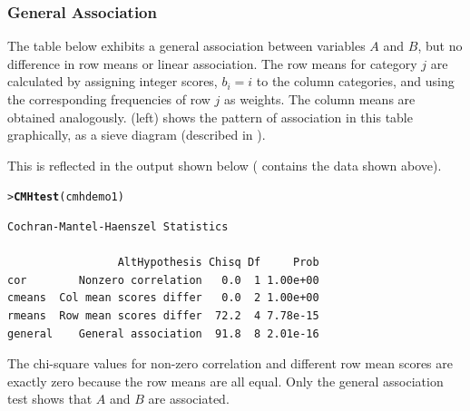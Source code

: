 \documentclass[10pt,krantz2]{krantz}\usepackage[]{graphicx}\usepackage[]{color}
\makeatletter
\newcommand{\hlstd}[1]{\textcolor[rgb]{0.345,0.345,0.345}{#1}}%
\newcommand{\hlkwd}[1]{\textcolor[rgb]{0.737,0.353,0.396}{\textbf{#1}}}%
\newenvironment{kframe}{%
 \def\at@end@of@kframe{}%
 \ifinner\ifhmode%
  \def\at@end@of@kframe{\end{minipage}}%
  \begin{minipage}{\columnwidth}%
 \fi\fi%
 \def\FrameCommand##1{\hskip\@totalleftmargin \hskip-\fboxsep
 \colorbox{shadecolor}{##1}\hskip-\fboxsep
     \hskip-\linewidth \hskip-\@totalleftmargin \hskip\columnwidth}%
 \MakeFramed {\advance\hsize-\width
   \@totalleftmargin\z@ \linewidth\hsize
   \@setminipage}}%
 {\par\unskip\endMakeFramed%
 \at@end@of@kframe}
\newenvironment{knitrout}{}{} %
\renewenvironment{knitrout}{\small\renewcommand{\baselinestretch}{.85}}{} %
\makeatother
\begin{document}
\subsubsection{General Association}
The table below exhibits a
general association between variables $A$ and $B$, but no difference in
row means or linear association.  The row means for category $j$ are calculated by
assigning integer scores, $b_i = i$ to the column categories, and
using the corresponding frequencies of row $j$ as weights. The column
means are obtained analogously. 
 (left) shows
the pattern of association in this table graphically, as a sieve diagram
(described in ).




This is reflected in the  output shown below
( contains the data shown above).
\begin{knitrout}
\color{fgcolor}\begin{kframe}
\begin{alltt}
\hlstd{> }\hlkwd{CMHtest}\hlstd{(cmhdemo1)}
\end{alltt}
\begin{verbatim}
Cochran-Mantel-Haenszel Statistics 

                 AltHypothesis Chisq Df     Prob
cor        Nonzero correlation   0.0  1 1.00e+00
cmeans  Col mean scores differ   0.0  2 1.00e+00
rmeans  Row mean scores differ  72.2  4 7.78e-15
general    General association  91.8  8 2.01e-16
\end{verbatim}
\end{kframe}
\end{knitrout}

The chi-square values for non-zero correlation and different
row mean scores are exactly zero because the row means are all equal.
Only the general association test shows that $A$ and $B$
are associated.
\end{document}

